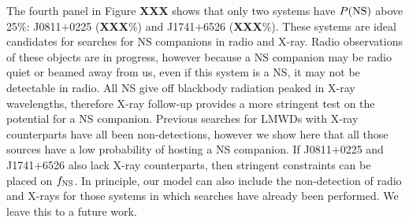 \documentclass[apjl]{emulateapj}
\begin{document}
The fourth panel in Figure {\bf XXX} shows  that only two systems have $P({\rm NS})$ above 25\%: J0811$+$0225 ({\bf XXX}\%) and J1741$+$6526 ({\bf XXX}\%). These systems are ideal candidates for searches for NS companions in radio and X-ray. Radio observations of these objects are in progress, however because a NS companion may be radio quiet or beamed away from us, even if this system is a NS, it may not be detectable in radio. All NS give off blackbody radiation peaked in X-ray wavelengths, therefore X-ray follow-up provides a more stringent test on the potential for a NS companion. Previous searches for LMWDs with X-ray counterparts have all been non-detections, however we show here that all those sources have a low probability of hosting a NS companion. If J0811$+$0225 and J1741$+$6526 also lack X-ray counterparts, then stringent constraints can be placed on $f_{\rm NS}$. In principle, our model can also include the non-detection of radio and X-rays for those systems in which searches have already been performed. We leave this to a future work.





%
%





\end{document}
